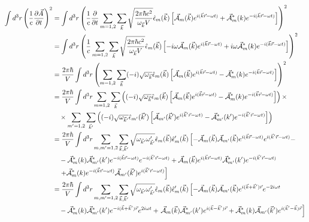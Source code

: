 \begin{align}
  \label{eq:13}
 \int d^3r  \left( \frac{1}{c} \pdiff{\vec A}_t \right)^2 &= \int d^3r  \left( \frac{1}{c} \pdiff_t    \sum_{m=1,2} \sum_{\vec k} \sqrt{\frac{2\pi\hbar c^2}{\omega_{\vec k}V}}  \hat \epsilon_m(\vec k)  \left[  \vec{\mathcal A}_m (\vec k)  e^{i(\vec k\vec r-\omega t)} + \vec{\mathcal A}^*_m (k) e^{-i(\vec k\vec r-\omega t)}\right] \right)^2 \notag\\
&= \int d^3r  \left( \frac{1}{c}  \sum_{m=1,2} \sum_{\vec k} \sqrt{\frac{2\pi\hbar c^2}{\omega_{\vec k}V}}  \hat \epsilon_m(\vec k)  \left[ -i\omega \vec{\mathcal A}_m (\vec k)  e^{i(\vec k\vec r-\omega t)} + i\omega \vec{\mathcal A}^*_m (k) e^{-i(\vec k\vec r-\omega t)}\right] \right)^2 \notag\\
&=  \frac{2\pi\hbar}{V} \int d^3r  \left( \sum_{m=1,2} \sum_{\vec k} (-i)\sqrt{\omega_{\vec k}} \hat \epsilon_m(\vec k)  \left[\vec{\mathcal A}_m (\vec k)  e^{i(\vec k\vec r-\omega t)} - \vec{\mathcal A}^*_m (k) e^{-i(\vec k\vec r-\omega t)}\right] \right)^2 \notag\\
&=  \frac{2\pi\hbar}{V} \int d^3r  \sum_{m=1,2} \sum_{\vec k}  \left((-i) \sqrt{\omega_{\vec k}} \hat \epsilon_m(\vec k)  \left[\vec{\mathcal A}_m (\vec k)  e^{i(\vec k\vec r-\omega t)} - \vec{\mathcal A}^*_m (k) e^{-i(\vec k\vec r-\omega t)}\right] \right) \times   \notag\\
  &\quad \times \sum_{m'=1,2} \sum_{\vec k'} \left((-i) \sqrt{\omega_{\vec k'}} \hat \epsilon_{m'}(\vec k')  \left[\vec{\mathcal A}_{m'} (\vec k')  e^{i(\vec k'\vec r-\omega t)} - \vec{\mathcal A}^*_{m'} (k') e^{-i(\vec k'\vec r-\omega t)}\right] \right) \notag \\
%
&= \frac{2\pi\hbar}{V} \int d^3r  \sum_{m,m'=1,2} \sum_{\vec k,\vec k'}   \sqrt{\omega_{\vec k'}\omega'_{\vec k'}} \hat \epsilon_m(\vec k) \hat \epsilon'_m(\vec k)  \left[ - \vec{\mathcal A}_m (\vec k) \vec{\mathcal A}_{m'} (\vec k)e^{i(\vec k\vec r-\omega t)}e^{i(\vec k'\vec r-\omega t)} - \right. \notag\\
&\quad -  \vec{\mathcal A}^*_m (k) \vec{\mathcal A}^*_{m'} (k') e^{-i(\vec k\vec r-\omega t)}e^{-i(\vec k'\vec r-\omega t)} + \vec{\mathcal A}_{m} (\vec k)  e^{i(\vec k\vec r-\omega t)}\vec{\mathcal A}^*_{m'} (k') e^{-i(\vec k'\vec r-\omega t)} \notag\\
&\quad\left. + \vec{\mathcal A}^*_m (k) e^{-i(\vec k\vec r-\omega t)}\vec{\mathcal A}_{m'} (\vec k')  e^{i(\vec k'\vec r-\omega t)}   \right]\notag\\
%
&= \frac{2\pi\hbar}{V} \int d^3r  \sum_{m,m'=1,2} \sum_{\vec k,\vec k'}   \sqrt{\omega_{\vec k'}\omega'_{\vec k'}} \hat \epsilon_m(\vec k) \hat \epsilon'_m(\vec k)  
\left[ - \vec{\mathcal A}_m (\vec k) \vec{\mathcal A}_{m'} (\vec k)e^{i(\vec k+\vec k')\vec r}e^{-2i\omega t}  \right. \notag\\
&\quad -  \vec{\mathcal A}^*_m (k) \vec{\mathcal A}^*_{m'} (k') e^{-i(\vec k+\vec k')\vec r}e^{2i\omega t} 
+ \left.\vec{\mathcal A}_{m} (\vec k)  \vec{\mathcal A}^*_{m'} (k') e^{i(\vec k-\vec k')\vec r} 
 + \vec{\mathcal A}^*_m (k) \vec{\mathcal A}_{m'} (\vec k') e^{i(\vec k'-\vec k)\vec r}    \right]
\end{align}

